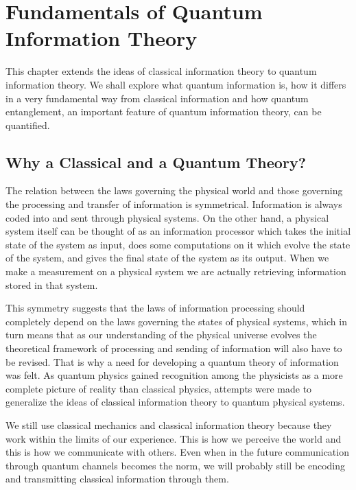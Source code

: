 \chapter{Fundamentals of Quantum Information Theory}

This chapter extends the ideas of classical information theory to quantum information theory. We shall explore what quantum information is, how it differs in a very fundamental way from classical information and how quantum entanglement, an important feature of quantum information theory, can be quantified.

\section{Why a Classical and a Quantum Theory?}
The relation between the laws governing the physical world and those governing the processing and transfer of information is symmetrical. Information is always coded into and sent through physical systems. On the other hand, a physical system itself can be thought of as an information processor which takes the initial state of the system as input, does some computations on it which evolve the state of the system, and gives the final state of the system as its output. When we make a measurement on a physical system we are actually retrieving information stored in that system.
\par This symmetry suggests that the laws of information processing should completely depend on the laws governing the states of physical systems, which in turn means that as our understanding of the physical universe evolves the theoretical framework of processing and sending of information will also have to be revised. That is why a need for developing a quantum theory of information was felt. As quantum physics gained recognition among the physicists as a more complete picture of reality than classical physics, attempts were made to generalize the ideas of classical information theory to quantum physical systems.
\par We still use classical mechanics and classical information theory because they work within the limits of our experience. This is how we perceive the world and this is how we communicate with others. Even when in the future communication through quantum channels becomes the norm, we will probably still be encoding and transmitting classical information through them.

